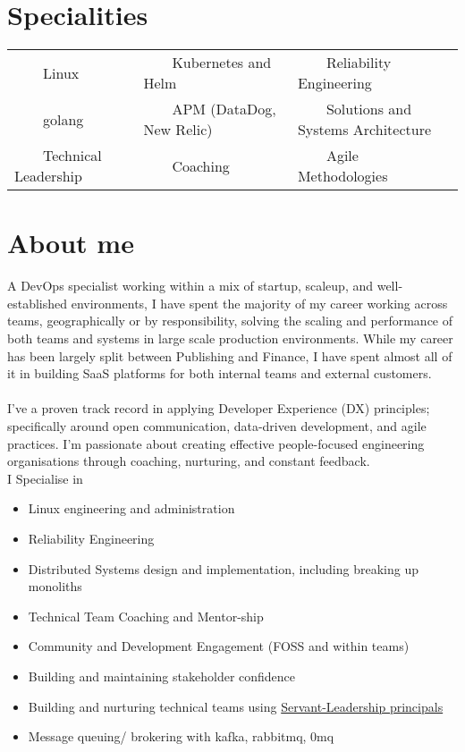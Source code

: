 \documentclass[11pt,a4paper,sans]{article}
\newcommand{\tabitem}{~~\llap{\textbullet}~~}
\begin{document}


\section{Specialities}
\begin{tabular}{lll}
  \tabitem Linux & \tabitem Kubernetes and Helm & \tabitem Reliability Engineering \\
  \tabitem golang & \tabitem APM (DataDog, New Relic) & \tabitem Solutions and Systems Architecture \\
  \tabitem Technical Leadership & \tabitem Coaching & \tabitem Agile Methodologies \\
\end{tabular}

\section{About me}
A DevOps specialist working within a mix of startup, scaleup, and well-established environments, I have spent the majority of my career working across teams, geographically or by responsibility, solving the scaling and performance of both teams and systems in large scale production environments. While my career has been largely split between Publishing and Finance, I have spent almost all of it in building SaaS platforms for both internal teams and external customers. \\
\\
I've a proven track record in applying Developer Experience (DX) principles; specifically around open communication, data-driven development, and agile practices. I'm passionate about creating effective people-focused engineering organisations through coaching, nurturing, and constant feedback.
\\
I Specialise in

\begin{itemize}
\item Linux engineering and administration
\item Reliability Engineering
\item Distributed Systems design and implementation, including breaking up monoliths
\item Technical Team Coaching and Mentor-ship
\item Community and Development Engagement (FOSS and within teams)
\item Building and maintaining stakeholder confidence
\item Building and nurturing technical teams using \href{https://www.mindtools.com/pages/article/servant-leadership.htm}{Servant-Leadership principals}
\item Message queuing/ brokering with kafka, rabbitmq, 0mq
\end{itemize}
\end{document}

